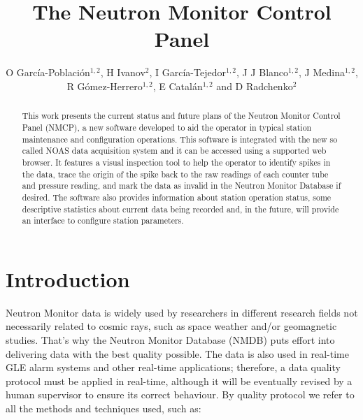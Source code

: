 \documentclass[a4paper]{jpconf}
\begin{document}
\title{The Neutron Monitor Control Panel}

\author{O García-Población$^{1,2}$, H Ivanov$^2$, I García-Tejedor$^{1,2}$,
J J Blanco$^{1,2}$, J Medina$^{1,2}$, R Gómez-Herrero$^{1,2}$, E
Catalán$^{1,2}$ and D Radchenko$^{2}$}

\address{$^1$ Space Research Group, University of Alcalá, Spain}
\address{$^2$ Castilla-La Mancha Neutron Monitor, Parque Tecnológico de Guadalajara, Spain}


\begin{abstract} 

    This work presents the current status and future plans of the Neutron
    Monitor Control Panel (NMCP), a new software developed to aid the operator
    in typical station maintenance and configuration operations. This software
    is integrated with the new so called NOAS data acquisition system and it
    can be accessed using a supported web browser. It features a visual
    inspection tool to help the operator to identify spikes in the data, trace
    the origin of the spike back to the raw readings of each counter tube and
    pressure reading, and mark the data as invalid in the Neutron Monitor
    Database if desired. The software also provides information about station
    operation status, some descriptive statistics about current data being
    recorded and, in the future, will provide an interface to configure station
    parameters.

\end{abstract}

\section{Introduction}

Neutron Monitor data is widely used by researchers in different research
fields not necessarily related to cosmic rays, such as space weather and/or
geomagnetic studies. That's why the Neutron Monitor Database
(NMDB)\cite{NMDB2011} puts effort into delivering data with the best quality
possible. The data is also used in real-time GLE alarm systems and other
real-time applications; therefore, a data quality protocol must be applied in
real-time, although it will be eventually revised by a human supervisor to ensure
 its correct behaviour. By quality protocol we refer to
all the methods and techniques used, such as:
\end{document}

